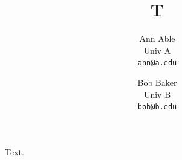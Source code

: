 \documentclass{article}
\begin{document}
\title{T}
\author{Ann Able\\ Univ A\\ \texttt{ann@a.edu} \and Bob Baker\\ Univ B\\ \texttt{bob@b.edu}}
\maketitle
Text.
\end{document}
